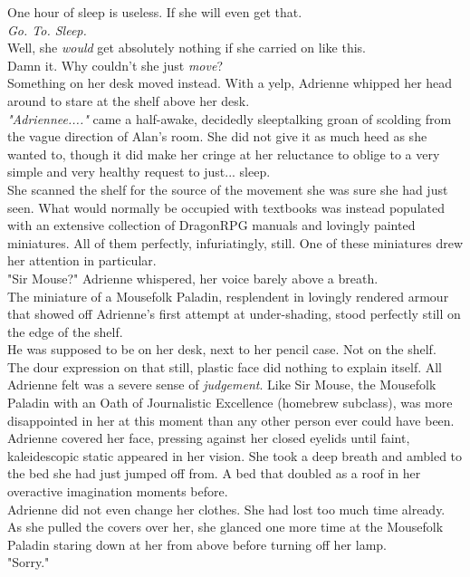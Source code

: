 One hour of sleep is useless.
If she will even get that.\\

\textit{Go. To. Sleep.}\\

Well, she \textit{would} get absolutely nothing if she carried on like this.\\

Damn it. Why couldn't she just \textit{move}?\\

Something on her desk moved instead.
With a yelp, Adrienne whipped her head around to stare at the shelf above her desk.\\

\textit{"Adriennee...."} came a half-awake, decidedly sleeptalking groan of scolding from the vague direction of Alan's room.
She did not give it as much heed as she wanted to, though it did make her cringe at her reluctance to oblige to a very simple and very healthy request to just... sleep.\\

She scanned the shelf for the source of the movement she was sure she had just seen.
What would normally be occupied with textbooks was instead populated with an extensive collection of DragonRPG manuals and lovingly painted miniatures.
All of them perfectly, infuriatingly, still.
One of these miniatures drew her attention in particular.\\

"Sir Mouse?" Adrienne whispered, her voice barely above a breath.\\

The miniature of a Mousefolk Paladin, resplendent in lovingly rendered armour that showed off Adrienne's first attempt at under-shading, stood perfectly still on the edge of the shelf.\\

He was supposed to be on her desk, next to her pencil case. 
Not on the shelf.\\

The dour expression on that still, plastic face did nothing to explain itself. 
All Adrienne felt was a severe sense of \textit{judgement}.
Like Sir Mouse, the Mousefolk Paladin with an Oath of Journalistic Excellence (homebrew subclass), was more disappointed in her at this moment than any other person ever could have been.\\

Adrienne covered her face, pressing against her closed eyelids until faint, kaleidescopic static appeared in her vision.
She took a deep breath and ambled to the bed she had just jumped off from. 
A bed that doubled as a roof in her overactive imagination moments before.\\

Adrienne did not even change her clothes.
She had lost too much time already.\\

As she pulled the covers over her, she glanced one more time at the Mousefolk Paladin staring down at her from above before turning off her lamp.\\

"Sorry."
